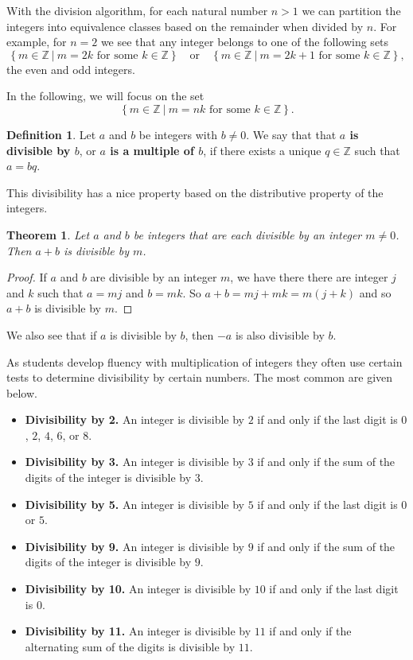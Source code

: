 \documentclass[
]{book}
\newtheorem{theorem}{Theorem}[chapter]
\theoremstyle{definition}
\newtheorem{definition}{Definition}[chapter]
\theoremstyle{definition}
\theoremstyle{definition}
\theoremstyle{definition}
\theoremstyle{remark}
\begin{document}
With the division algorithm, for each natural number \(n>1\) we can partition the integers into equivalence classes based on the remainder when divided by \(n\). For example, for \(n=2\) we see that any integer belongs to one of the following sets
\[\left\{m\in \mathbb{Z} \: \vert \: m=2k \mbox{ for some } k\in \mathbb{Z} \right\} \quad \mbox{or} \quad \left\{m\in \mathbb{Z} \: \vert \: m=2k+1 \mbox{ for some } k\in \mathbb{Z} \right\},\] the even and odd integers.

In the following, we will focus on the set \[\left\{ m\in \mathbb{Z} \: \vert \: m=nk \mbox{ for some } k\in \mathbb{Z} \right\}.\]

\begin{definition}
\protect\hypertarget{def:divisible}{}\label{def:divisible}Let \(a\) and \(b\) be integers with \(b\neq 0\). We say that that \textbf{\(a\) is divisible by \(b\)}, or \textbf{\(a\) is a multiple of \(b\)}, if there exists a unique \(q\in \mathbb{Z}\) such that \(a=bq\).
\end{definition}

This divisibility has a nice property based on the distributive property of the integers.

\begin{theorem}
Let \(a\) and \(b\) be integers that are each divisible by an integer \(m\neq 0\). Then \(a+b\) is divisible by \(m\).
\end{theorem}

\begin{proof}
If \(a\) and \(b\) are divisible by an integer \(m\), we have there there are integer \(j\) and \(k\) such that \(a=mj\) and \(b=mk\). So \(a+b=mj+mk=m(j+k)\) and so \(a+b\) is divisible by \(m\).
\end{proof}

We also see that if \(a\) is divisible by \(b\), then \(-a\) is also divisible by \(b\).

As students develop fluency with multiplication of integers they often use certain tests to determine divisibility by certain numbers. The most common are given below.

\begin{itemize}
\item
  \textbf{Divisibility by 2.} An integer is divisible by \(2\) if and only if the last digit is \(0\), \(2\), \(4\), \(6\), or \(8\).
\item
  \textbf{Divisibility by 3.} An integer is divisible by \(3\) if and only if the sum of the digits of the integer is divisible by \(3\).
\item
  \textbf{Divisibility by 5.} An integer is divisible by \(5\) if and only if the last digit is \(0\) or \(5\).
\item
  \textbf{Divisibility by 9.} An integer is divisible by \(9\) if and only if the sum of the digits of the integer is divisible by \(9\).
\item
  \textbf{Divisibility by 10.} An integer is divisible by \(10\) if and only if the last digit is \(0\).
\item
  \textbf{Divisibility by 11.} An integer is divisible by \(11\) if and only if the alternating sum of the digits is divisible by \(11\).
\end{itemize}
\end{document}
